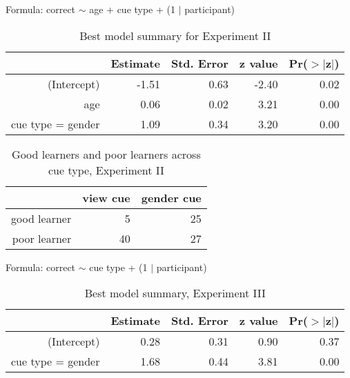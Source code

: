 \documentclass{frontiersSCNS} %
\begin{document}
\vspace{1cm}


\renewcommand{\tabcolsep}{3pt}
\begin{table}[ht]
Formula: correct $\sim{}$ age + cue type + (1 $|$ participant)\\
\centering
\begin{tabular}{rrrrr}
  \hline
 & Estimate & Std. Error & z value & Pr($>$$|$z$|$) \\ 
  \hline
(Intercept) & -1.51 & 0.63 & -2.40 & 0.02 \\ 
  age & 0.06 & 0.02 & 3.21 & 0.00 \\ 
  cue type = gender & 1.09 & 0.34 & 3.20 & 0.00 \\ 
   \hline
\end{tabular}
\caption{ \large Best model summary for Experiment II}
\label{summaryexp2}
\end{table}

\vspace{1cm}



\begin{table}[ht]
\centering
\begin{tabular}{rrr}
  \hline
 & view cue & gender cue \\ 
  \hline
good learner &   5 &  25 \\ 
poor learner &  40 &  27 \\ 
   \hline
\end{tabular}
\caption{ \large  Good learners and poor learners across cue type, Experiment II}
\label{exp2table}
\end{table}

\vspace{1cm}


\begin{table}[ht]
Formula: correct $\sim{}$ cue type + (1 $|$ participant)\\
\centering
\begin{tabular}{rrrrr}
  \hline
 & Estimate & Std. Error & z value & Pr($>$$|$z$|$) \\ 
  \hline
(Intercept) & 0.28 & 0.31 & 0.90 & 0.37 \\ 
  cue type = gender & 1.68 & 0.44 & 3.81 & 0.00 \\ 
   \hline
\end{tabular}\caption{ \large Best model summary, Experiment III}
\label{exp3summary}
\end{table}

\vspace{1cm}
\end{document}

